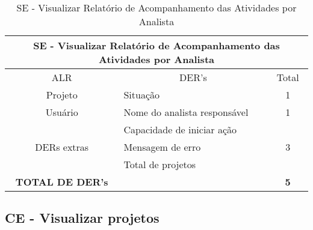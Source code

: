       \begin{table}[!h]
      \centering
      \caption{SE - Visualizar Relatório de Acompanhamento das Atividades por Analista}
      \label{se_visualizar_relatorio_acompanhamento_analista}
      \begin{tabular}{|c|l|c|}
      \hline
      \multicolumn{3}{|c|}{SE - Visualizar Relatório de Acompanhamento das Atividades por Analista} \\ \hline
      ALR                               & \multicolumn{1}{c|}{DER's}       & Total                  \\ \hline
      Projeto                           & Situação                         & 1                      \\ \hline
      Usuário                           & Nome do analista responsável     & 1                      \\ \hline
      \multirow{3}{*}{DERs extras}      & Capacidade de iniciar ação       & \multirow{3}{*}{3}     \\ \cline{2-2}
					& Mensagem de erro                 &                        \\ \cline{2-2}
					& Total de projetos                &                        \\ \hline
      \textbf{TOTAL DE DER's}           &                                  & \textbf{5}             \\ \hline
      \end{tabular}
      \end{table}
  
  \vfill
  \pagebreak
  \subsection{CE - Visualizar projetos}
  

